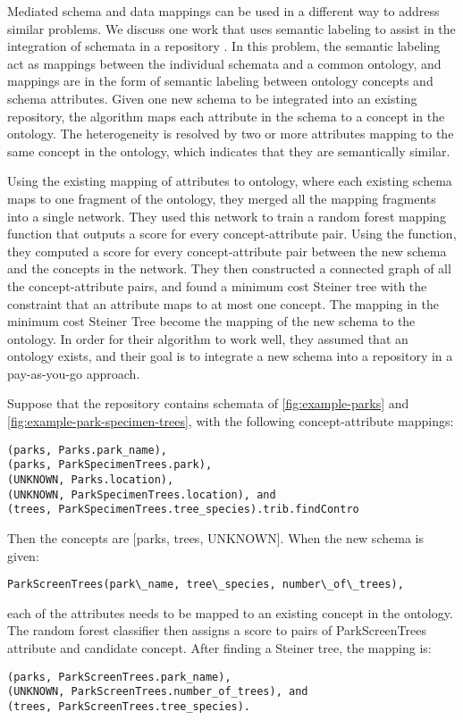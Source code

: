 Mediated schema and data mappings can be used in a different way to address similar problems. We discuss one work that uses semantic labeling to assist in the integration of schemata in a repository \cite{Diego2018Machine}. In this problem, the semantic labeling act as mappings between the individual schemata and a common ontology, and mappings are in the form of semantic labeling between ontology concepts and schema attributes. Given one new schema to be integrated into an existing repository, the algorithm maps each attribute in the schema to a concept in the ontology. The heterogeneity is resolved by two or more attributes mapping to the same concept in the ontology, which indicates that they are semantically similar.

Using the existing mapping of attributes to ontology, where each existing schema maps to one fragment of the ontology, they merged all the mapping fragments into a single network. They used this network to train a random forest mapping function that outputs a score for every concept-attribute pair. Using the function, they computed a score for every concept-attribute pair between the new schema and the concepts in the network. They then constructed a connected graph of all the concept-attribute pairs, and found a minimum cost Steiner tree with the constraint that an attribute maps to at most one concept. The mapping in the minimum cost Steiner Tree become the mapping of the new schema to the ontology. In order for their algorithm to work well, they assumed that an ontology exists, and their goal is to integrate a new schema into a repository in a pay-as-you-go approach.

Suppose that the repository contains schemata of \autoref{fig:example-parks} and \autoref{fig:example-park-specimen-trees}, with the following concept-attribute mappings:
\begin{lstlisting}
(parks, Parks.park_name),
(parks, ParkSpecimenTrees.park),
(UNKNOWN, Parks.location),
(UNKNOWN, ParkSpecimenTrees.location), and
(trees, ParkSpecimenTrees.tree_species).trib.findContro
\end{lstlisting}

Then the concepts are [parks, trees, UNKNOWN]. When the new schema is given:
\begin{lstlisting}
ParkScreenTrees(park\_name, tree\_species, number\_of\_trees),
\end{lstlisting}
each of the attributes needs to be mapped to an existing concept in the ontology. The random forest classifier then assigns a score to pairs of ParkScreenTrees attribute and candidate concept. 
After finding a Steiner tree, the mapping is:
\begin{lstlisting}
(parks, ParkScreenTrees.park_name),
(UNKNOWN, ParkScreenTrees.number_of_trees), and
(trees, ParkScreenTrees.tree_species).
\end{lstlisting}

